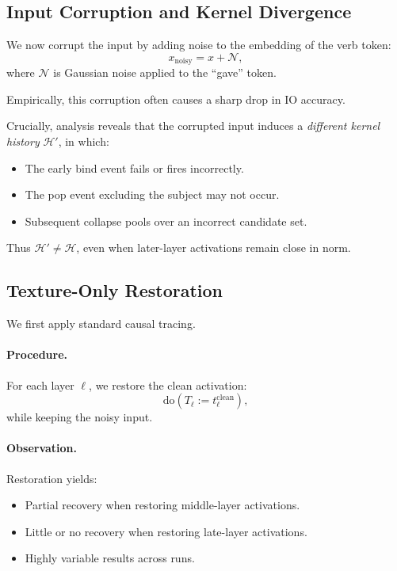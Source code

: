 \documentclass[11pt]{article}
\theoremstyle{remark}
\newcommand{\Hist}{\mathcal{H}}
\newcommand{\Noise}{\mathcal{N}}
\newcommand{\Do}{\mathrm{do}}
\begin{document}
\subsection{Input Corruption and Kernel Divergence}

We now corrupt the input by adding noise to the embedding of the verb
token:
\[
x_{\text{noisy}} = x + \Noise,
\]
where $\Noise$ is Gaussian noise applied to the ``gave'' token.

Empirically, this corruption often causes a sharp drop in IO accuracy.

Crucially, analysis reveals that the corrupted input induces a
\emph{different kernel history} $\Hist'$, in which:

\begin{itemize}
\item The early bind event fails or fires incorrectly.
\item The pop event excluding the subject may not occur.
\item Subsequent collapse pools over an incorrect candidate set.
\end{itemize}

Thus $\Hist' \neq \Hist$, even when later-layer activations remain close
in norm.

\subsection{Texture-Only Restoration}

We first apply standard causal tracing.

\paragraph{Procedure.}
For each layer $\ell$, we restore the clean activation:
\[
\Do(T_\ell := t_\ell^{\text{clean}}),
\]
while keeping the noisy input.

\paragraph{Observation.}
Restoration yields:
\begin{itemize}
\item Partial recovery when restoring middle-layer activations.
\item Little or no recovery when restoring late-layer activations.
\item Highly variable results across runs.
\end{itemize}
\end{document}
